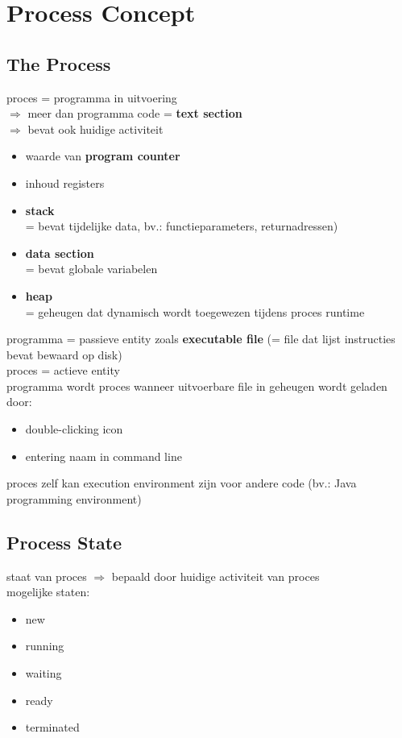 \documentclass{report}
\begin{document}
\section{Process Concept}
\subsection{The Process}
proces  = programma in uitvoering
\\$\Rightarrow$ meer dan programma code = \textbf{text section}
\\$\Rightarrow$ bevat ook huidige activiteit 
\begin{itemize}
\item waarde van \textbf{program counter}
\item inhoud registers
\item \textbf{stack}
\\ = bevat tijdelijke data, bv.: functieparameters, returnadressen)
\item \textbf{data section}
\\ = bevat globale variabelen
\item \textbf{heap}
\\ = geheugen dat dynamisch wordt toegewezen tijdens proces runtime
\end{itemize}
programma = passieve entity zoals \textbf{executable file} (= file dat lijst instructies bevat bewaard op disk)
\\proces = actieve entity
\\programma wordt proces wanneer uitvoerbare file in geheugen wordt geladen door:
\begin{itemize}
\item double-clicking icon 
\item entering naam in command line
\end{itemize}
proces zelf kan execution environment zijn voor andere code (bv.: Java programming environment)

\subsection{Process State}
staat van proces $\Rightarrow$ bepaald door huidige activiteit van proces
\\mogelijke staten:
\begin{itemize}
\item new
\item running
\item waiting
\item ready
\item terminated
\end{itemize}
\end{document}
